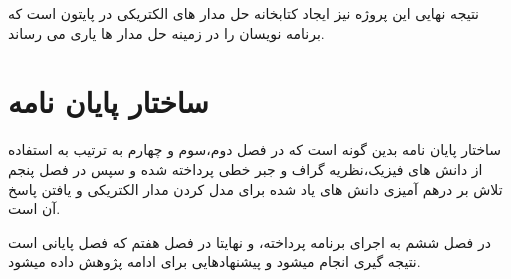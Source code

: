  نتیجه نهایی این پروژه نیز ایجاد کتابخانه حل مدار های الکتریکی در پایتون است که برنامه نویسان را در زمینه حل مدار ها یاری می رساند.
\section{ساختار پایان نامه}
ساختار پایان نامه بدین گونه است که در فصل دوم،سوم و چهارم به ترتیب به استفاده از دانش های فیزیک،نظریه گراف و جبر خطی پرداخته شده و سپس در فصل پنجم تلاش بر درهم آمیزی دانش های یاد شده برای مدل کردن مدار الکتریکی و یافتن پاسخ آن است.

در فصل ششم به اجرای برنامه پرداخته،
و نهایتا در فصل هفتم که فصل پایانی است نتیجه گیری انجام میشود و پیشنهادهایی برای ادامه پژوهش داده میشود.


